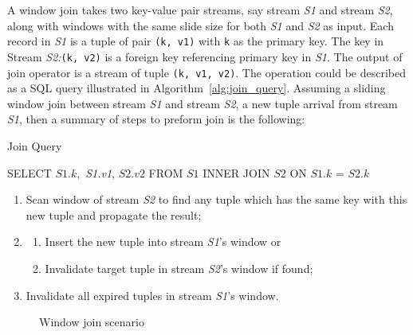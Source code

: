 A window join takes two key-value pair streams, say stream \textit{S1} and stream \textit{S2}, along with windows with the same slide size for both \textit{S1} and \textit{S2} as input. Each record in \textit{S1} is a tuple of pair \texttt{(k, v1)} with \texttt{k} as the primary key. The key in Stream \textit{S2:}\texttt{(k, v2)} is a foreign key referencing primary key in \textit{S1}. The output of join operator is a stream of tuple \texttt{(k, v1, v2)}. The operation could be described as a SQL query illustrated in Algorithm~\ref{alg:join_query}. Assuming a sliding window join between stream \textit{S1} and stream \textit{S2}, a new tuple arrival from stream \textit{S1}, then a summary of steps to preform join is the following:

\begin{algorithm}
\caption{Join Query}\label{euclid}
\label{alg:join_query}
\begin{algorithmic}[1]
\State SELECT $\textit{S1.k},  $\textit{ S1.v1},  $\textit{S2.v2}$
\State FROM $\textit{S1}$
\State INNER JOIN $\textit{S2}$
\State ON $\textit{S1.k}$ =  $\textit{S2.k}$
\end{algorithmic}
\end{algorithm}

\begin{enumerate}
\item Scan window of stream \textit{S2} to find any tuple which has the same key with this new tuple and propagate the result;
\item 
\begin{enumerate}
\item Insert the new tuple into stream \textit{S1}'s window or
\item Invalidate target tuple in stream \textit{S2}'s window if found;
\end{enumerate}
\item Invalidate all expired tuples in stream \textit{S1}'s window.
\end{enumerate}

\begin{figure}
  \begin{center}
   \caption{Window join scenario}
   \label{fig:window_join}
  \end{center}
\end{figure}

